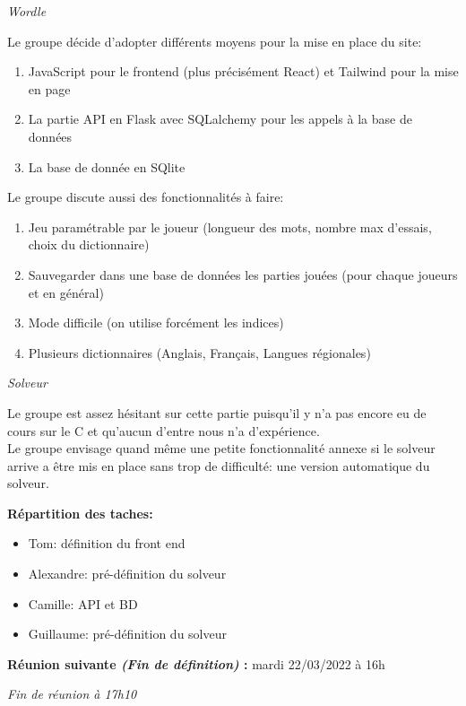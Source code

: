 \documentclass[12pt,a4paper,final]{report}
\begin{document}
\begin{flushleft}
    \textit{Wordle}
\end{flushleft}
Le groupe décide d'adopter différents moyens pour la mise en place du site:
\begin{enumerate}
    \item JavaScript pour le frontend (plus précisément React) et Tailwind pour la mise en page
    \item La partie API en Flask avec SQLalchemy pour les appels à la base de données
    \item La base de donnée en SQlite 
\end{enumerate}
Le groupe discute aussi des fonctionnalités à faire:
\begin{enumerate}
    \item Jeu paramétrable par le joueur (longueur des mots, nombre max d'essais, choix du dictionnaire)
    \item Sauvegarder dans une base de données les parties jouées (pour chaque joueurs et en général)
    \item Mode difficile (on utilise forcément les indices)
    \item Plusieurs dictionnaires (Anglais, Français, Langues régionales)
\end{enumerate}
\newpage 
\begin{flushleft}
    \textit{Solveur}
\end{flushleft}
Le groupe est assez hésitant sur cette partie puisqu'il y n'a pas encore eu de cours sur le C et qu'aucun d'entre nous n'a d'expérience.\\
Le groupe envisage quand même une petite fonctionnalité annexe si le solveur arrive a être mis en place sans trop de difficulté: une version automatique du solveur.


\begin{flushleft}
    \textbf{Répartition des taches:}
\end{flushleft}
\begin{itemize}
    \item Tom: définition du front end
    \item Alexandre: pré-définition du solveur
    \item Camille: API et BD
    \item Guillaume: pré-définition du solveur
\end{itemize}

\begin{flushleft}
    \textbf{Réunion suivante \textit{(Fin de définition)} :} mardi 22/03/2022 à 16h
\end{flushleft}

\textit{Fin de réunion à 17h10}
\end{document}
